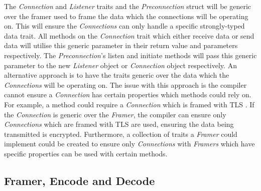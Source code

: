 The \emph{Connection} and \emph{Listener} traits and the \emph{Preconnection} struct will be generic over the framer
used to frame the data which the connections will be operating on.
This will ensure the \emph{Connections} can only handle a specific strongly-typed data trait.
All methods on the \emph{Connection} trait which either receive data or send data will utilise this generic parameter in
their return value and parameters respectively.
The \emph{Preconnection}'s listen and initiate methods will pass this generic parameter to the new \emph{Listener}
object or \emph{Connection} object respectively.
An alternative approach is to have the traits generic over the data which the \emph{Connections} will be operating on.
The issue with this approach is the compiler cannot ensure a \emph{Connection} has certain properties which methods
could rely on.
For example, a method could require a \emph{Connection} which is framed with TLS .
If the \emph{Connection} is generic over the \emph{Framer}, the compiler can ensure only \emph{Connections} which are
framed with TLS are used, ensuring the data being transmitted is encrypted.
Furthermore, a collection of traits a \emph{Framer} could implement could be created to ensure only \emph{Connections}
with \emph{Framers} which have specific properties can be used with certain methods.

\subsection{Framer, Encode and Decode}\label{subsec:framer-encode-and-decode}

